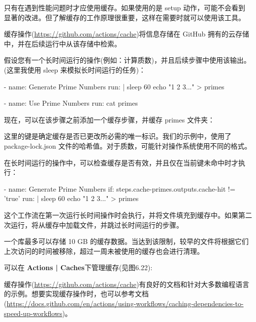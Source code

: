 
只有在遇到性能问题时才应使用缓存。如果使用的是 setup 动作，可能不会看到显著的改进。但了解缓存的工作原理很重要，这样在需要时就可以使用该工具。

缓存操作(\url{https://github.com/actions/cache})将信息存储在 GitHub 拥有的云存储中，并在后续运行中从该存储中检索。

假设您有一个长时间运行的操作(例如：计算质数)，并且后续步骤中使用该输出。(这里我使用 sleep 来模拟长时间运行的任务)：

\begin{shell}
- name: Generate Prime Numbers
  run: |
    sleep 60
    echo "1 2 3..." > primes

- name: Use Prime Numbers
  run: cat primes
\end{shell}

现在，可以在该步骤之前添加一个缓存步骤，并缓存 primes 文件夹：


这里的键是确定缓存是否已更改所必需的唯一标识。我们的示例中，使用了 package-lock.json 文件的哈希值。对于质数，可能针对操作系统使用不同的格式。

在长时间运行的操作中，可以检查缓存是否有效，并且仅在当前键未命中时才执行：

\begin{shell}
- name: Generate Prime Numbers
  if: steps.cache-primes.outputs.cache-hit != 'true'
  run: |
    sleep 60
    echo "1 2 3..." > primes
\end{shell}

这个工作流在第一次运行长时间操作时会执行，并将文件填充到缓存中。如果第二次运行，将从缓存中加载文件，并跳过长时间运行的步骤。


一个库最多可以存储 10 GB 的缓存数据。当达到该限制，较早的文件将根据它们上次访问的时间被移除，超过一周未被使用的缓存也会进行清理。

可以在 \textbf{Actions | Caches}下管理缓存(见图6.22):


缓存操作(\url{https://github.com/actions/cache})有良好的文档和针对大多数编程语言的示例。想要实现缓存操作时，也可以参考文档(\url{https://docs.github.com/en/actions/using-workflows/caching-dependencies-to-speed-up-workflows})。